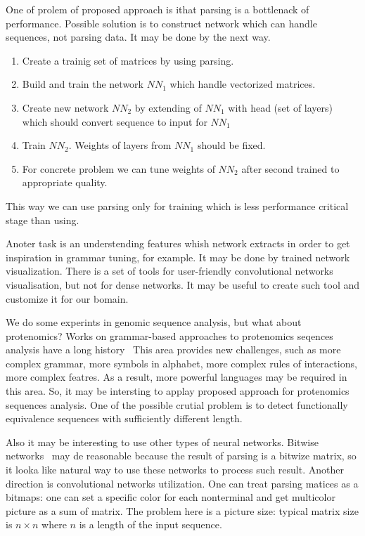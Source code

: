 \documentclass[a4paper,twoside]{article}
\begin{document}
One of prolem of proposed approach is ithat parsing is a bottlenack of performance.
Possible solution is to construct network which can handle sequences, not parsing data.
It may be done by the next way.
\begin{enumerate}
\item Create a trainig set of matrices by using parsing.
\item Build and train the network $NN_1$ which handle vectorized matrices.
\item Create new network $NN_2$ by extending  of $NN_1$ with head (set of layers) which should convert sequence to input for $NN_1$
\item Train $NN_2$. Weights of layers from $NN_1$ should be fixed.
\item For concrete problem we can tune weights of $NN_2$ after second trained to appropriate quality.
\end{enumerate}
This way we can use parsing only for training which is less performance critical stage than using.

Anoter task is an understending features whish network extracts in order to get inspiration in grammar tuning, for example.
It may be done by trained network visualization.
There is a set of tools for user-friendly convolutional networks visualisation, but not for dense networks.
It may be useful to create such tool and customize it for our bomain.

We do some experints in genomic sequence analysis, but what about protenomics?
Works on grammar-based approaches to protenomics seqences analysis have a long history~\cite{Jimenez-Montaño1984,Dyrka2008ASC,Sciacca2011AnnotatedSC}%
This area provides new challenges, such as more complex grammar, more symbols in alphabet, more complex rules of interactions, more complex featres.
As a result, more powerful languages may be required in this area.
So, it may be intersting to applay proposed approach for protenomics sequences analysis.
One of the possible crutial problem is to detect functionally equivalence sequences with sufficiently different length.

Also it may be interesting to use other types of neural networks.
Bitwise networks~\cite{DBLP:journals:corr:KimS16} may de reasonable because the result of parsing is a bitwize matrix, so it looka like natural way to use these networks to process such result. 
Another direction is convolutional networks utilization.
One can treat parsing matices as a bitmaps: one can set a specific color for each nonterminal and get multicolor picture as a sum of matrix.
The problem here is a picture size: typical matrix size is $n \times n$ where $n$ is a length of the input sequence.
\end{document}
